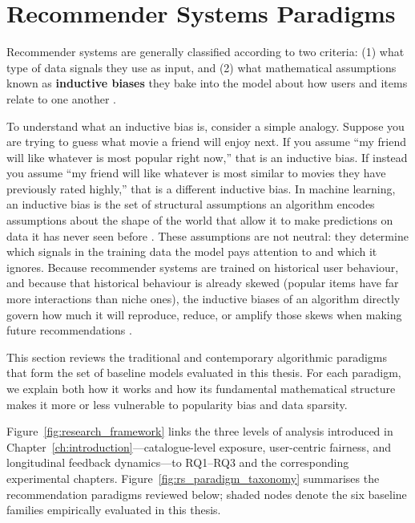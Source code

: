 \documentclass[11pt,a4paper]{report}
\begin{document}
\section{Recommender Systems Paradigms}
\label{sec:lit_paradigms}

Recommender systems are generally classified according to two criteria: (1) what type of data signals they use as input, and (2) what mathematical assumptions known as \textbf{inductive biases} they bake into the model about how users and items relate to one another \citep{ricci2015recommender}.

To understand what an inductive bias is, consider a simple analogy. Suppose you are trying to guess what movie a friend will enjoy next. If you assume ``my friend will like whatever is most popular right now,'' that is an inductive bias. If instead you assume ``my friend will like whatever is most similar to movies they have previously rated highly,'' that is a different inductive bias. In machine learning, an inductive bias is the set of structural assumptions an algorithm encodes assumptions about the shape of the world that allow it to make predictions on data it has never seen before \citep{hastie2009elements}. These assumptions are not neutral: they determine which signals in the training data the model pays attention to and which it ignores. Because recommender systems are trained on historical user behaviour, and because that historical behaviour is already skewed (popular items have far more interactions than niche ones), the inductive biases of an algorithm directly govern how much it will reproduce, reduce, or amplify those skews when making future recommendations \citep{jannach2015balances}.

This section reviews the traditional and contemporary algorithmic paradigms that form the set of baseline models evaluated in this thesis. For each paradigm, we explain both how it works and how its fundamental mathematical structure makes it more or less vulnerable to popularity bias and data sparsity.

Figure~\ref{fig:research_framework} links the three levels of analysis introduced in Chapter~\ref{ch:introduction}---catalogue-level exposure, user-centric fairness, and longitudinal feedback dynamics---to RQ1--RQ3 and the corresponding experimental chapters. Figure~\ref{fig:rs_paradigm_taxonomy} summarises the recommendation paradigms reviewed below; shaded nodes denote the six baseline families empirically evaluated in this thesis.
\end{document}
